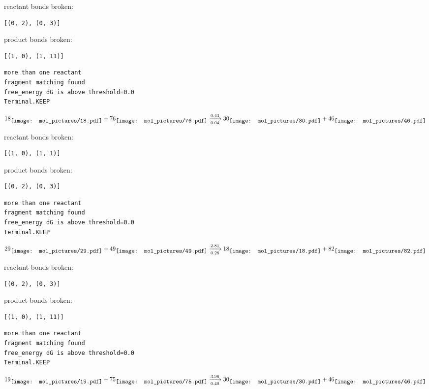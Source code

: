 \documentclass{article}
\begin{document}
reactant bonds broken:\begin{verbatim}
[(0, 2), (0, 3)]
\end{verbatim}
product bonds broken:\begin{verbatim}
[(1, 0), (1, 11)]
\end{verbatim}




\vspace{1cm}
\begin{verbatim}
more than one reactant
fragment matching found
free_energy dG is above threshold=0.0
Terminal.KEEP
\end{verbatim}
$$
18
\raisebox{-.5\height}{\texttt{[image: mol\_pictures/18.pdf]}}
+
76
\raisebox{-.5\height}{\texttt{[image: mol\_pictures/76.pdf]}}
\xrightarrow[0.04]{0.43}
30
\raisebox{-.5\height}{\texttt{[image: mol\_pictures/30.pdf]}}
+
46
\raisebox{-.5\height}{\texttt{[image: mol\_pictures/46.pdf]}}
$$


reactant bonds broken:\begin{verbatim}
[(1, 0), (1, 1)]
\end{verbatim}
product bonds broken:\begin{verbatim}
[(0, 2), (0, 3)]
\end{verbatim}




\vspace{1cm}
\begin{verbatim}
more than one reactant
fragment matching found
free_energy dG is above threshold=0.0
Terminal.KEEP
\end{verbatim}
$$
29
\raisebox{-.5\height}{\texttt{[image: mol\_pictures/29.pdf]}}
+
49
\raisebox{-.5\height}{\texttt{[image: mol\_pictures/49.pdf]}}
\xrightarrow[0.28]{2.81}
18
\raisebox{-.5\height}{\texttt{[image: mol\_pictures/18.pdf]}}
+
82
\raisebox{-.5\height}{\texttt{[image: mol\_pictures/82.pdf]}}
$$


reactant bonds broken:\begin{verbatim}
[(0, 2), (0, 3)]
\end{verbatim}
product bonds broken:\begin{verbatim}
[(1, 0), (1, 11)]
\end{verbatim}




\vspace{1cm}
\begin{verbatim}
more than one reactant
fragment matching found
free_energy dG is above threshold=0.0
Terminal.KEEP
\end{verbatim}
$$
19
\raisebox{-.5\height}{\texttt{[image: mol\_pictures/19.pdf]}}
+
75
\raisebox{-.5\height}{\texttt{[image: mol\_pictures/75.pdf]}}
\xrightarrow[0.40]{3.96}
30
\raisebox{-.5\height}{\texttt{[image: mol\_pictures/30.pdf]}}
+
46
\raisebox{-.5\height}{\texttt{[image: mol\_pictures/46.pdf]}}
$$
\end{document}

